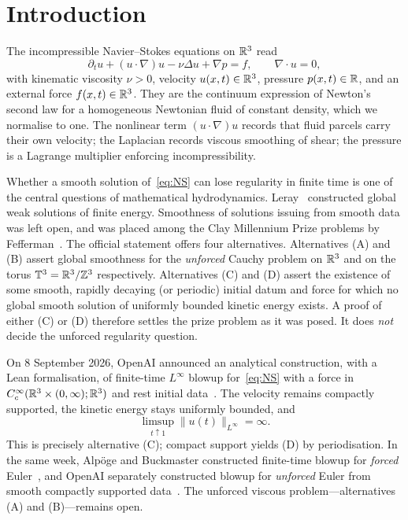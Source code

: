 \section{Introduction}
\label{sec:intro}

The incompressible {N}avier--{S}tokes equations on $\mathbb{R}^3$ read
\begin{equation}
\label{eq:NS}
\partial_t u+(u\cdot\nabla)u-\nu\Delta u+\nabla p=f,
\qquad
\nabla\cdot u=0,
\end{equation}
with kinematic viscosity $\nu>0$, velocity $u(x,t)\in\mathbb{R}^3$, pressure $p(x,t)\in\mathbb{R}$, and an external force $f(x,t)\in\mathbb{R}^3$. They are the continuum expression of {N}ewton's second law for a homogeneous {N}ewtonian fluid of constant density, which we normalise to one. The nonlinear term $(u\cdot\nabla)u$ records that fluid parcels carry their own velocity; the {L}aplacian records viscous smoothing of shear; the pressure is a {L}agrange multiplier enforcing incompressibility.

Whether a smooth solution of~\eqref{eq:NS} can lose regularity in finite time is one of the central questions of mathematical hydrodynamics. {L}eray~\cite{leray1934} constructed global weak solutions of finite energy. Smoothness of solutions issuing from smooth data was left open, and was placed among the {C}lay {M}illennium {P}rize problems by {F}efferman~\cite{fefferman2000}. The official statement offers four alternatives. Alternatives (A) and (B) assert global smoothness for the \emph{unforced} Cauchy problem on $\mathbb{R}^3$ and on the torus $\mathbb{T}^3=\mathbb{R}^3/\mathbb{Z}^3$ respectively. Alternatives (C) and (D) assert the existence of some smooth, rapidly decaying (or periodic) initial datum and force for which no global smooth solution of uniformly bounded kinetic energy exists. A proof of either (C) or (D) therefore settles the prize problem as it was posed. It does \emph{not} decide the unforced regularity question.

On 8 September 2026, {O}pen{AI} announced an analytical construction, with a {L}ean formalisation, of finite-time $L^\infty$ blowup for~\eqref{eq:NS} with a force in $C_c^\infty(\mathbb{R}^3\times(0,\infty);\mathbb{R}^3)$ and rest initial data~\cite{openai2026ns,openai2026blog}. The velocity remains compactly supported, the kinetic energy stays uniformly bounded, and
\[
\limsup_{t\uparrow 1}\|u(t)\|_{L^\infty}=\infty.
\]
This is precisely alternative (C); compact support yields (D) by periodisation. In the same week, {A}lp{\"o}ge and {B}uckmaster constructed finite-time blowup for \emph{forced} {E}uler~\cite{alpoegbuckmaster2026}, and {O}pen{AI} separately constructed blowup for \emph{unforced} {E}uler from smooth compactly supported data~\cite{openai2026euler}. The unforced viscous problem---alternatives (A) and (B)---remains open.

